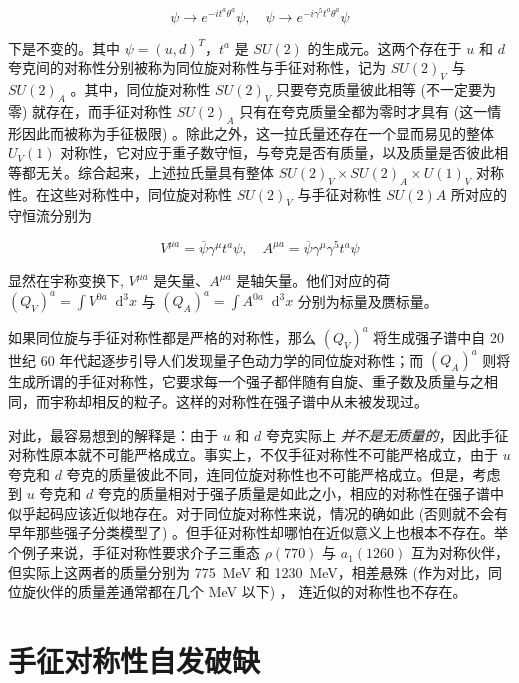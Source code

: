 \documentclass[oneside,a4paper,openany,11pt]{ctexbook}
\newcommand*{\dif}{\mathop{}\!\mathrm{d}} %
\begin{document}
\begin{equation}
    \psi \to e^{-i t^a \theta^a} \psi, \quad \psi \to e^{-i \gamma^5 t^a \theta^a} \psi
\end{equation}

\noindent 下是不变的。其中 $\psi=(u, d)^T$，$t^a$ 是 $SU(2)$ 的生成元。这两个存在于 $u$ 和 $d$ 夸克间的对称性分别被称为同位旋对称性与手征对称性，记为 $SU(2)_V$ 与 $SU(2)_A$ 。其中，同位旋对称性 $SU(2)_V$ 只要夸克质量彼此相等 (不一定要为零) 就存在，而手征对称性 $SU(2)_A$ 只有在夸克质量全都为零时才具有 (这一情形因此而被称为手征极限) 。除此之外，这一拉氏量还存在一个显而易见的整体 $U_V(1)$ 对称性，它对应于重子数守恒，与夸克是否有质量，以及质量是否彼此相等都无关。综合起来，上述拉氏量具有整体 $SU(2)_V \times SU(2)_A \times U(1)_V$ 对称性。在这些对称性中，同位旋对称性 $SU(2)_V$ 与手征对称性 $SU(2)A$ 所对应的守恒流分别为

\begin{equation}
    V^{\mu a} = \overline{\psi} \gamma^\mu t^a \psi, \quad A^{\mu a} = \overline{\psi} \gamma^\mu \gamma^5 t^a \psi
\end{equation}

\noindent 显然在宇称变换下, $V^{\mu a}$ 是矢量、$A^{\mu a}$ 是轴矢量。他们对应的荷 $(Q_V)^a=\int V^{0a} \dif^3 x$ 与 $(Q_A)^a=\int A^{0a} \dif^3 x$ 分别为标量及赝标量。

如果同位旋与手征对称性都是严格的对称性，那么 $(Q_V)^a$ 将生成强子谱中自 20 世纪 60 年代起逐步引导人们发现量子色动力学的同位旋对称性；而 $(Q_A)^a$ 则将生成所谓的手征对称性，它要求每一个强子都伴随有自旋、重子数及质量与之相同，而宇称却相反的粒子。这样的对称性在强子谱中从未被发现过。

对此，最容易想到的解释是：由于 $u$ 和 $d$ 夸克实际上 \emph{并不是无质量的}，因此手征对称性原本就不可能严格成立。事实上，不仅手征对称性不可能严格成立，由于 $u$ 夸克和 $d$ 夸克的质量彼此不同，连同位旋对称性也不可能严格成立。但是，考虑到 $u$ 夸克和 $d$ 夸克的质量相对于强子质量是如此之小，相应的对称性在强子谱中似乎起码应该近似地存在。对于同位旋对称性来说，情况的确如此 (否则就不会有早年那些强子分类模型了) 。但手征对称性却哪怕在近似意义上也根本不存在。举个例子来说，手征对称性要求介子三重态 $\rho(770)$ 与 $a_1(1260)$ 互为对称伙伴，但实际上这两者的质量分别为 \qty{775}{MeV} 和 \qty{1230}{MeV}，相差悬殊 (作为对比，同位旋伙伴的质量差通常都在几个 \unit{MeV} 以下) ， 连近似的对称性也不存在。

\section{手征对称性自发破缺}
\end{document}
